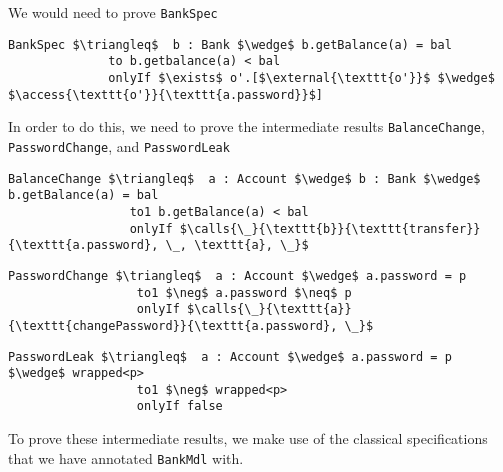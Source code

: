 We would need to prove \texttt{BankSpec}
\begin{lstlisting}[language = Chainmail, mathescape=true, frame=lines]
BankSpec $\triangleq$  b : Bank $\wedge$ b.getBalance(a) = bal 
              to b.getbalance(a) < bal
              onlyIf $\exists$ o'.[$\external{\texttt{o'}}$ $\wedge$ $\access{\texttt{o'}}{\texttt{a.password}}$]
\end{lstlisting}
In order to do this, we need to prove the intermediate results \texttt{BalanceChange}, \texttt{PasswordChange}, and \texttt{PasswordLeak}
\begin{lstlisting}[language = Chainmail, mathescape=true, frame=lines]
BalanceChange $\triangleq$  a : Account $\wedge$ b : Bank $\wedge$ b.getBalance(a) = bal
                 to1 b.getBalance(a) < bal
                 onlyIf $\calls{\_}{\texttt{b}}{\texttt{transfer}}{\texttt{a.password}, \_, \texttt{a}, \_}$
\end{lstlisting}
\begin{lstlisting}[language = Chainmail, mathescape=true, frame=lines]
PasswordChange $\triangleq$  a : Account $\wedge$ a.password = p
                  to1 $\neg$ a.password $\neq$ p
                  onlyIf $\calls{\_}{\texttt{a}}{\texttt{changePassword}}{\texttt{a.password}, \_}$
\end{lstlisting}
\begin{lstlisting}[language = Chainmail, mathescape=true, frame=lines]
PasswordLeak $\triangleq$  a : Account $\wedge$ a.password = p $\wedge$ wrapped<p>
                  to1 $\neg$ wrapped<p>
                  onlyIf false
\end{lstlisting}
To prove these intermediate results, we make use of the classical specifications 
that we have annotated \texttt{BankMdl} with.
